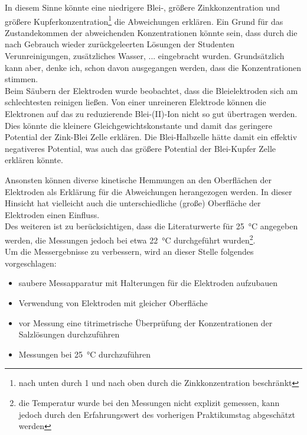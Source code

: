\documentclass{article}
\begin{document}
      In diesem Sinne könnte eine niedrigere Blei-, größere Zinkkonzentration und größere Kupferkonzentration\footnote{nach unten durch 1 und nach oben durch die Zinkkonzentration beschränkt} die Abweichungen erklären. Ein Grund für das Zustandekommen der abweichenden Konzentrationen könnte sein, dass durch die nach Gebrauch wieder zurückgeleerten Lösungen der Studenten Verunreinigungen, zusätzliches Wasser, ... eingebracht wurden. Grundsätzlich kann aber, denke ich, schon davon ausgegangen werden, dass die Konzentrationen stimmen. \\
      
      Beim Säubern der Elektroden wurde beobachtet, dass die Bleielektroden sich am schlechtesten reinigen ließen. Von einer unreineren Elektrode können die Elektronen auf das zu reduzierende Blei-(II)-Ion nicht so gut übertragen werden. Dies könnte die kleinere Gleichgewichtskonstante und damit das geringere Potential der Zink-Blei Zelle erklären. Die Blei-Halbzelle hätte damit ein effektiv negativeres Potential, was auch das größere Potential der Blei-Kupfer Zelle erklären könnte. 
      
      Ansonsten können diverse kinetische Hemmungen an den Oberflächen der Elektroden als Erklärung für die Abweichungen herangezogen werden. In dieser Hinsicht hat vielleicht auch die unterschiedliche (große) Oberfläche der Elektroden einen Einfluss. \\
      
      Des weiteren ist zu berücksichtigen, dass die Literaturwerte für \SI[mode=text]{25}{\degreeCelsius} angegeben werden, die Messungen jedoch bei etwa \SI[mode=text]{22}{\degreeCelsius} durchgeführt wurden\footnote{die Temperatur wurde bei den Messungen nicht explizit gemessen, kann jedoch durch den Erfahrungswert des vorherigen Praktikumstag abgeschätzt werden}. \\
      
      Um die Messergebnisse zu verbessern, wird an dieser Stelle folgendes vorgeschlagen: 
      
      \begin{itemize}
        \item saubere Messapparatur mit Halterungen für die Elektroden aufzubauen
        \item Verwendung von Elektroden mit gleicher Oberfläche
        \item vor Messung eine titrimetrische Überprüfung der Konzentrationen der Salzlösungen durchzuführen
        \item Messungen bei \SI[mode=text]{25}{\degreeCelsius} durchzuführen
      \end{itemize}
    
\end{document}
